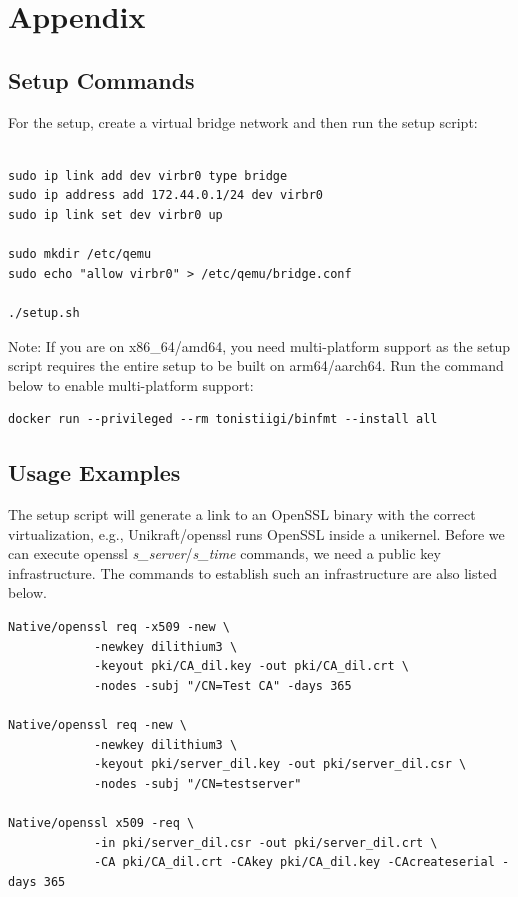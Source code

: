 \documentclass[public,noindent]{aisecreport}
\begin{document}
\printbibliography


\chapter{Appendix}

\section{Setup Commands}

For the setup, create a virtual bridge network and then run the setup script:

\begin{lstlisting}[style=shell]

sudo ip link add dev virbr0 type bridge
sudo ip address add 172.44.0.1/24 dev virbr0
sudo ip link set dev virbr0 up

sudo mkdir /etc/qemu
sudo echo "allow virbr0" > /etc/qemu/bridge.conf

./setup.sh

\end{lstlisting}

Note: If you are on x86\_64/amd64, you need multi-platform support as the setup script requires the entire setup to be built on arm64/aarch64. Run the command below to enable multi-platform support:

\begin{lstlisting}[style=shell]
docker run --privileged --rm tonistiigi/binfmt --install all
\end{lstlisting}

\section{Usage Examples}

The setup script will generate a link to an OpenSSL binary with the correct virtualization, e.g., Unikraft/openssl runs OpenSSL inside a unikernel. Before we can execute openssl \textit{s\_server}/\textit{s\_time} commands, we need a public key infrastructure. The commands to establish such an infrastructure are also listed below. 

\begin{lstlisting}[style=shell]
Native/openssl req -x509 -new \
			-newkey dilithium3 \
			-keyout pki/CA_dil.key -out pki/CA_dil.crt \
			-nodes -subj "/CN=Test CA" -days 365

Native/openssl req -new \
			-newkey dilithium3 \
			-keyout pki/server_dil.key -out pki/server_dil.csr \
			-nodes -subj "/CN=testserver"

Native/openssl x509 -req \
			-in pki/server_dil.csr -out pki/server_dil.crt \
			-CA pki/CA_dil.crt -CAkey pki/CA_dil.key -CAcreateserial -days 365
\end{lstlisting}
\end{document}
